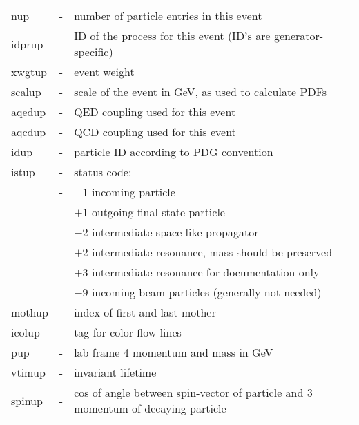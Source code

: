 \begin{center}
\begin{tabular}{lcl}
  nup    & - & number of particle entries in this event\\
  idprup & - & ID of the process for this event (ID's are generator-specific)\\
  xwgtup & - & event weight\\
  scalup & - & scale of the event in GeV, as used to calculate PDFs\\
  aqedup & - & QED coupling used for this event\\
  aqcdup & - & QCD coupling used for this event\\
  idup   & - & particle ID according to PDG convention\\
  istup  & - & status code:\\
  	 & - & $-1$ incoming particle\\
  	 & - & $+1$ outgoing final state particle\\
  	 & - & $-2$ intermediate space like propagator\\
  	 & - & $+2$ intermediate resonance, mass should be preserved\\
  	 & - & $+3$ intermediate resonance for documentation only\\
  	 & - & $-9$ incoming beam particles (generally not needed)\\
  mothup & - & index of first and last mother\\
  icolup & - & tag for color flow lines\\
  pup    & - & lab frame 4 momentum and mass in GeV\\
  vtimup & - & invariant lifetime\\
  spinup & - & cos of angle between spin-vector of particle and 3 momentum of decaying particle\\
\end{tabular}
\end{center}

